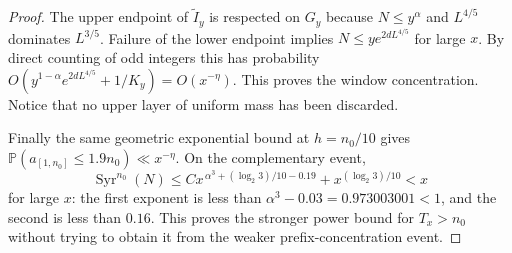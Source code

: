 \documentclass[11pt]{article}
\theoremstyle{remark}\newtheorem{remark}[proposition]{Remark}
\newcommand{\PP}{\mathbb P}
\newcommand{\Syr}{\operatorname{Syr}}
\begin{document}
\begin{proof}
The upper endpoint of $\widetilde I_y$ is respected on $G_y$
because $N\le y^\alpha$ and $L^{4/5}$ dominates $L^{3/5}$.
Failure of the lower endpoint implies
$N\le y e^{2dL^{4/5}}$ for large $x$. By direct counting of odd
integers this has probability
$O(y^{1-\alpha}e^{2dL^{4/5}}+1/K_y)=O(x^{-\eta})$.
This proves the window concentration. Notice that no upper layer
of uniform mass has been discarded.

Finally the same geometric exponential bound at $h=n_0/10$ gives
$\PP(a_{[1,n_0]}\le1.9n_0)\ll x^{-\eta}$.
On the complementary event,
\[
 \Syr^{n_0}(N)\le Cx^{\,\alpha^3+(\log_2 3)/10-0.19}
                    +x^{(\log_2 3)/10}<x
\]
for large $x$: the first exponent is less than
$\alpha^3-0.03=0.973003001<1$, and the second is less than $0.16$.
This proves the stronger power bound for $T_x>n_0$ without trying
to obtain it from the weaker prefix-concentration event.
\end{proof}
\end{document}
